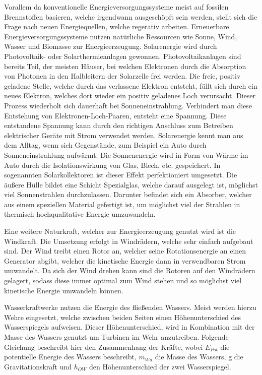 Vorallem da konventionelle Energieversorgungssysteme meist auf fossilen
Brennstoffen basieren, welche irgendwann ausgeschöpft sein werden, stellt sich
die Frage nach neuen Energiequellen, welche regerativ arbeiten.
Erneuerbare Energieversorgungssysteme nutzen natürliche Ressourcen wie Sonne,
Wind, Wasser und Biomasse zur Energieerzeugung. Solarenergie wird durch
Photovoltaik- oder Solarthermieanlagen gewonnen. Photovoltaikanlagen sind
bereits Teil, der meisten Häuser, bei welchen Elektronen durch die Absorption
von Photonen in den Halbleitern der Solarzelle frei werden. Die freie, positiv
geladene Stelle, welche durch das verlassene Elektron entsteht, füllt sich
durch ein neues Elektron, welches dort wieder ein positiv geladenes Loch
verursacht. Dieser Prozess wiederholt sich dauerhaft bei Sonneneinstrahlung.
Verhindert man diese Entstehung von Elektronen-Loch-Paaren, entsteht eine
Spannung. Diese entstandene Spannung kann durch den richtigen Anschluss zum
Betreiben elektrischer Geräte mit Strom verwendet
werden.\cite{renner2010grundlagen} Solarenergie kennt man aus dem Alltag, wenn
sich Gegenstände, zum Beispiel ein Auto durch Sonneneinstrahlung aufwärmt. Die
Sonnenenergie wird in Form von Wärme im Auto durch die Isolationswirkung von
Glas, Blech, etc. gespeichert. In sogenannten Solarkollektoren ist dieser
Effekt perfektioniert umgesetzt. Die äußere Hülle bildet eine Schicht
Spezialglas, welche darauf ausgelegt ist, möglichst viel Sonnenstrahlen
durchzulassen. Darunter befindet sich ein Absorber, welcher aus einem
speziellen Material gefertigt ist, um möglichst viel der Strahlen in thermisch
hochqualitative Energie umzuwandeln.\cite{schabbach2014solarthermie}

Eine weitere Naturkraft, welcher zur Energieerzeugung genutzt wird ist die
Windkraft. Die Umsetzung erfolgt in Windrädern, welche sehr einfach aufgebaut
sind. Der Wind treibt einen Rotor an, welcher seine Rotationsenergie an einen
Generator abgibt, welcher die kinetische Energie dann in verwendbaren Strom
umwandelt. Da sich der Wind drehen kann sind die Rotoren auf den Windrädern
gelagert, sodass diese immer optimal zum Wind stehen und so möglichst viel
kinetische Energie umwandeln können.\cite{osterhage2015windkraft}

Wasserkraftwerke nutzen die Energie des fließenden Wassers. Meist werden hierzu
Wehre eingesetzt, welche zwischen beiden Seiten einen Höhenunterschied des
Wasserspiegels aufweisen. Dieser Höhenunterschied, wird in Kombination mit der
Masse des Wassers genutzt um Turbinen im Wehr anzutreiben. Folgende Gleichung
beschreibt hier den Zusammenhang der Kräfte, wobei $E_{Pot}$ die potentielle
Energie des Wassers beschreibt, $m_{Wa}$ die Masse des Wassers, g die
Gravitationskraft und $h_{OW}$ den Höhenunterschied der zwei Wasserspiegel.

